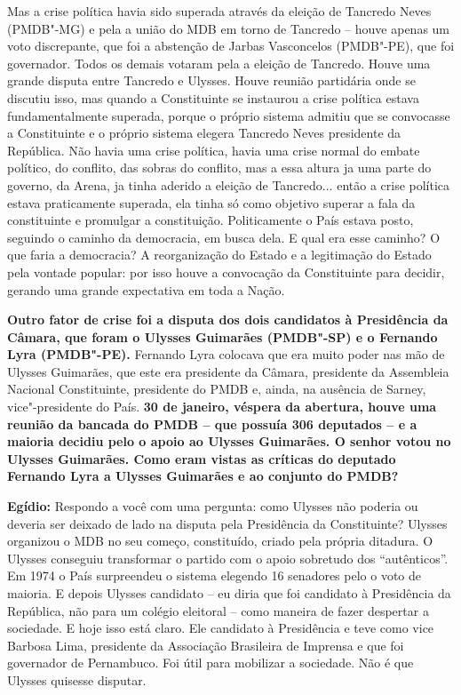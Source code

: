 Mas a crise política havia sido superada através da eleição de Tancredo
Neves (PMDB"-MG) e pela a união do MDB em torno de Tancredo -- houve
apenas um voto discrepante, que foi a abstenção de Jarbas Vasconcelos
(PMDB"-PE), que foi governador. Todos os demais votaram pela a eleição de
Tancredo. Houve uma grande disputa entre Tancredo e Ulysses. Houve
reunião partidária onde se discutiu isso, mas quando a Constituinte se
instaurou a crise política estava fundamentalmente superada, porque o
próprio sistema admitiu que se convocasse a Constituinte e o próprio
sistema elegera Tancredo Neves presidente da República. Não havia uma
crise política, havia uma crise normal do embate político, do conflito,
das sobras do conflito, mas a essa altura ja uma parte do governo, da
Arena, ja tinha aderido a eleição de Tancredo... então a crise política
estava praticamente superada, ela tinha só como objetivo superar a fala
da constituinte e promulgar a constituição. Politicamente o País estava
posto, seguindo o caminho da democracia, em busca dela. E qual era esse
caminho? O que faria a democracia? A reorganização do Estado e a
legitimação do Estado pela vontade popular: por isso houve a convocação
da Constituinte para decidir, gerando uma grande expectativa em toda a
Nação.

\textbf{Outro fator de crise foi a disputa dos dois candidatos à
Presidência da Câmara, que foram o Ulysses Guimarães (PMDB"-SP) e o
Fernando Lyra (PMDB"-PE).} Fernando Lyra colocava que era muito poder nas
mão de Ulysses Guimarães, que este era presidente da Câmara, presidente
da Assembleia Nacional Constituinte, presidente do PMDB e, ainda, na
ausência de Sarney, vice"-presidente do País. \textbf{30 de janeiro,
véspera da abertura, houve uma reunião da bancada do PMDB -- que possuía
306 deputados -- e a maioria decidiu pelo o apoio ao Ulysses Guimarães.
O senhor votou no Ulysses Guimarães. Como eram vistas as críticas do
deputado Fernando Lyra a Ulysses Guimarães e ao conjunto do PMDB?}

\textbf{Egídio:} Respondo a você com uma pergunta: como Ulysses não
poderia ou deveria ser deixado de lado na disputa pela Presidência da
Constituinte? Ulysses organizou o MDB no seu começo, constituído, criado
pela própria ditadura. O Ulysses conseguiu transformar o partido com o
apoio sobretudo dos ``autênticos''. Em 1974 o País surpreendeu o sistema
elegendo 16 senadores pelo o voto de maioria. E depois Ulysses candidato
-- eu diria que foi candidato à Presidência da República, não para um
colégio eleitoral -- como maneira de fazer despertar a sociedade. E hoje
isso está claro. Ele candidato à Presidência e teve como vice Barbosa
Lima, presidente da Associação Brasileira de Imprensa e que foi
governador de Pernambuco. Foi útil para mobilizar a sociedade. Não é que
Ulysses quisesse disputar.

